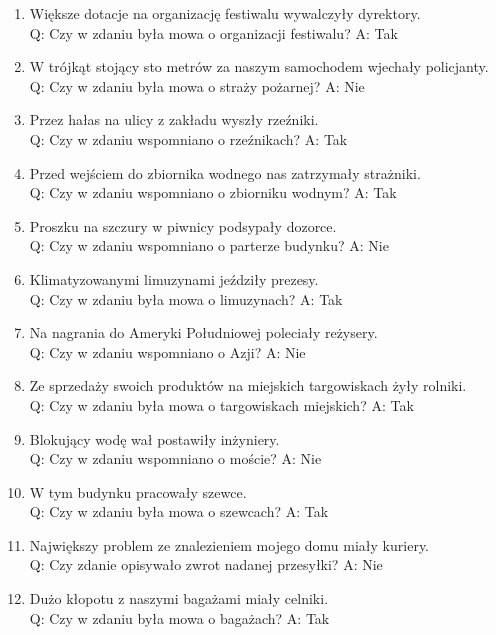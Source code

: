 \begin{enumerate}
	Q: Czy w zdaniu wspomniano o urazie kręgosłupa? A: Nie
\item Większe dotacje na organizację festiwalu wywalczyły dyrektory.\\
	Q: Czy w zdaniu była mowa o organizacji festiwalu? A: Tak
\item W trójkąt stojący sto metrów za naszym samochodem wjechały policjanty.\\
	Q: Czy w zdaniu była mowa o straży pożarnej? A: Nie
\item Przez hałas na ulicy z zakładu wyszły rzeźniki.\\
	Q: Czy w zdaniu wspomniano o rzeźnikach? A: Tak
\item Przed wejściem do zbiornika wodnego nas zatrzymały strażniki.\\
	Q: Czy w zdaniu wspomniano o zbiorniku wodnym? A: Tak
\item Proszku na szczury w piwnicy podsypały dozorce.\\
	Q: Czy w zdaniu wspomniano o parterze budynku? A: Nie
\item Klimatyzowanymi limuzynami jeździły prezesy.\\
	Q: Czy w zdaniu była mowa o limuzynach? A: Tak
\item Na nagrania do Ameryki Południowej poleciały reżysery.\\
	Q: Czy w zdaniu wspomniano o Azji? A: Nie
\item Ze sprzedaży swoich produktów na miejskich targowiskach żyły rolniki.\\
	Q: Czy w zdaniu była mowa o targowiskach miejskich? A: Tak
\item Blokujący wodę wał postawiły inżyniery.\\
	Q: Czy w zdaniu wspomniano o moście? A: Nie
\item W tym budynku pracowały szewce.\\
	Q: Czy w zdaniu była mowa o szewcach? A: Tak
\item Największy problem ze znalezieniem mojego domu miały kuriery.\\
	Q: Czy zdanie opisywało zwrot nadanej przesyłki? A: Nie
\item Dużo kłopotu z naszymi bagażami miały celniki.\\
	Q: Czy w zdaniu była mowa o bagażach? A: Tak
\end{enumerate}

